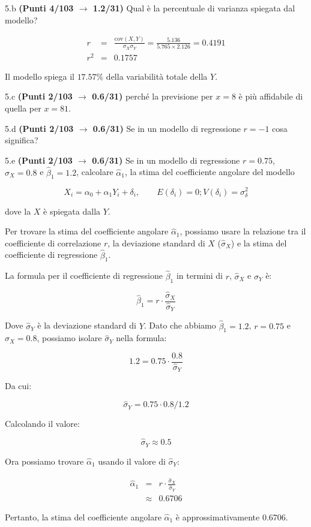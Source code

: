 \documentclass[
  11pt,
]{book}
\theoremstyle{mytheoremstyle}
\theoremstyle{mydefstyle}
\newenvironment{sol}
  {
  \begin{tcolorbox}[enhanced,breakable,arc=0.1mm,boxrule=1pt,colback=white,colframe=iblue,
  title=\bf \fontfamily{lmss}\selectfont \hspace{.5 cm} Soluzione,drop fuzzy shadow]

}{
\end{tcolorbox}
  }
\begin{document}
5.b \textbf{(Punti 4/103 \(\rightarrow\) 1.2/31)} Qual è la percentuale di varianza spiegata dal modello?

\begin{sol}
\begin{eqnarray*}
r&=&\frac{\text{cov}(X,Y)}{\sigma_X\sigma_Y}=\frac{ 5.136 }{ 5.765 \times 2.126 }= 0.4191 \\ 
r^2&=& 0.1757\end{eqnarray*}

Il modello spiega il \(17.57\%\) della variabilità totale della \(Y\).

\end{sol}

5.c \textbf{(Punti 2/103 \(\rightarrow\) 0.6/31)} perché la previsione per \(x=8\) è più affidabile di quella per \(x=81\).

5.d \textbf{(Punti 2/103 \(\rightarrow\) 0.6/31)} Se in un modello di regressione \(r=-1\) cosa significa?

5.e \textbf{(Punti 2/103 \(\rightarrow\) 0.6/31)} Se in un modello di regressione \(r=0.75\), \(\hat\sigma_X=0.8\) e \(\hat\beta_1=1.2\), calcolare
\(\hat\alpha_1\), la stima del coefficiente angolare del modello

\[
X_i = \alpha_0+\alpha_1 Y_i + \delta_i, \qquad E(\delta_i)=0; V(\delta_i)=\sigma_\delta^2
\]

dove la \(X\) è spiegata dalla \(Y\).

\begin{sol}
Per trovare la stima del coefficiente angolare \(\hat\alpha_1\), possiamo usare la relazione tra il coefficiente di correlazione \(r\), la deviazione standard di \(X\) (\(\hat\sigma_X\)) e la stima del coefficiente di regressione \(\hat\beta_1\).

La formula per il coefficiente di regressione \(\hat\beta_1\) in termini di \(r\), \(\hat\sigma_X\) e \(\hat\sigma_Y\) è:

\[
\hat\beta_1 = r \cdot \frac{\hat\sigma_X}{\hat\sigma_Y}
\]

Dove \(\hat\sigma_Y\) è la deviazione standard di \(Y\). Dato che abbiamo \(\hat\beta_1 = 1.2\), \(r = 0.75\) e \(\hat\sigma_X = 0.8\), possiamo isolare \(\hat\sigma_Y\) nella formula:

\[
1.2 = 0.75 \cdot \frac{0.8}{\hat\sigma_Y}
\]

Da cui:

\[
\hat\sigma_Y = 0.75 \cdot 0.8 / 1.2
\]

Calcolando il valore:

\[
\hat\sigma_Y \approx 0.5
\]

Ora possiamo trovare \(\hat\alpha_1\) usando il valore di \(\hat\sigma_Y\):

\begin{eqnarray*}
   \hat\alpha_1 &=& r \cdot \frac{\hat\sigma_X}{\hat\sigma_Y}\\
               &\approx& 0.6706
\end{eqnarray*}

Pertanto, la stima del coefficiente angolare \(\hat\alpha_1\) è approssimativamente 0.6706.

\end{sol}
\end{document}
